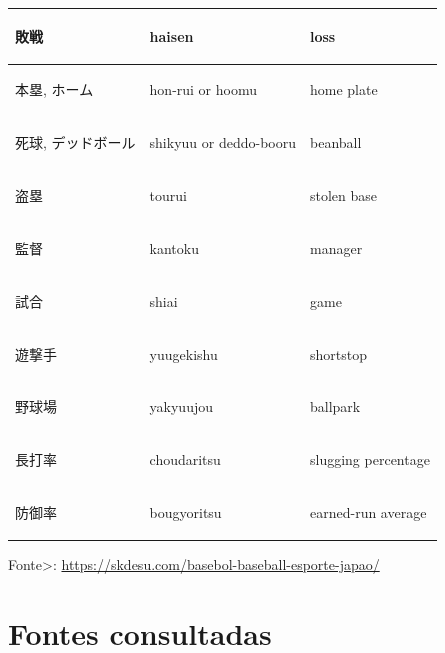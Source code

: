 \begin{tabular}{lll}
			\begin{CJK}{UTF8}{min}敗戦 \end{CJK} &haisen                          & loss                \\\hline
			\begin{CJK}{UTF8}{min}本塁, ホーム \end{CJK} &hon-rui or hoomu           & home plate          \\\hline
			\begin{CJK}{UTF8}{min}死球, デッドボール \end{CJK} &shikyuu or deddo-booru  & beanball            \\\hline
			\begin{CJK}{UTF8}{min}盗塁 \end{CJK} &tourui                          & stolen base         \\\hline
			\begin{CJK}{UTF8}{min}監督 \end{CJK} &kantoku                         & manager             \\\hline
			\begin{CJK}{UTF8}{min}試合 \end{CJK} &shiai                           & game                \\\hline
			\begin{CJK}{UTF8}{min}遊撃手 \end{CJK} &yuugekishu                     & shortstop           \\\hline
			\begin{CJK}{UTF8}{min}野球場 \end{CJK} &yakyuujou                      & ballpark            \\\hline
			\begin{CJK}{UTF8}{min}長打率 \end{CJK} &choudaritsu                    & slugging percentage \\\hline
			\begin{CJK}{UTF8}{min}防御率 \end{CJK} &bougyoritsu                    & earned-run average
		\end{tabular}
%

	\footnotesize{Fonte>: \url{https://skdesu.com/basebol-baseball-esporte-japao/}}

\chapter{Fontes consultadas}

